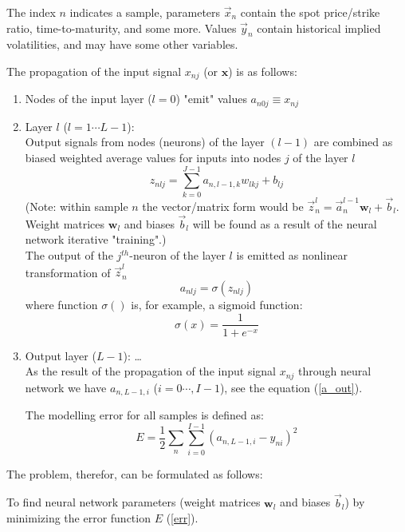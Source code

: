 \documentclass[10pt]{article}
\begin{document}
The index $n$ indicates a sample, parameters $\vec x_n$ contain the spot price/strike ratio, time-to-maturity, and some more. Values $\vec y_n$ contain historical implied volatilities, and may have some other variables. 

The propagation of the input signal $x_{nj}$ (or $\textbf{x}$) is as follows:
\begin{enumerate}
\item Nodes of the input layer ($l=0$) "emit" values $a_{n0j} \equiv x_{nj} $
\item Layer $l$ ($l=1\cdots L-1$): \\
Output signals from nodes (neurons) of the layer $(l-1)$ are combined as biased weighted average values for inputs into nodes $j$ of the layer $l$
 \begin{equation}
 \label{zab}
z_{nlj} = \sum_{k=0}^{J-1} a_{n,l-1,k}w_{lkj} + b_{lj}
\end{equation}
(Note: within sample $n$ the vector/matrix form would be $\vec{z}_n^l = \vec{a}_n^{l-1}\textbf{w}_l + \vec {b}_l$. 
Weight matrices $\textbf{w}_l$ and biases $\vec {b}_l$ will be found as a result of the neural network iterative "training".)\\
The output of the $j^{th}$-neuron of the layer $l$ is emitted as nonlinear transformation of  $\vec{z}_n^l $ 
\begin{equation}
\label{a_out}
a_{nlj} = \sigma(z_{nlj})
\end{equation}
where function $\sigma()$ is, for example, a sigmoid function:
\begin{equation}
\sigma(x) = \frac{1}{1+ e^{-x}}
\end{equation}
\item Output layer ($L-1$): \ldots \\
As the result of the propagation of the input signal $x_{nj}$ through neural network we have $a_{n,L-1,i}$ ($i=0 \cdots , I-1$), see the equation (\ref{a_out}). 

The modelling error for all samples is defined as:
\begin{equation}
\label{err}
E = \frac{1}{2}\sum_n \sum_{i=0}^{I-1} (a_{n,L-1,i} - y_{ni})^2
\end{equation}
\end{enumerate} 

The problem, therefor, can be formulated as follows: \\

\begin{tcolorbox}
To find neural network parameters (weight matrices $\textbf{w}_l$ and biases $\vec {b}_l$) by minimizing the error function $E$ (\ref{err}).
\end{tcolorbox}
\end{document}
